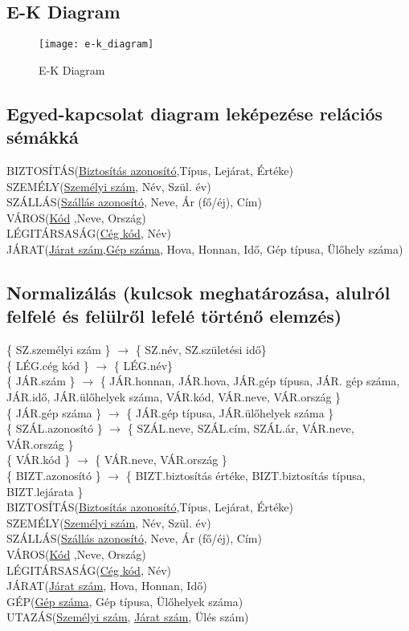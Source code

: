 \subsection{E-K Diagram}

\begin{figure}[!htb]

    \centering
    \texttt{[image: e-k\_diagram]}
    \caption{\label{fig:e-k_diagram}E-K Diagram}

\end{figure}
\pagebreak
\subsection{Egyed-kapcsolat diagram leképezése relációs sémákká}

    BIZTOSÍTÁS(\underline{Biztosítás azonosító},Típus, Lejárat, Értéke)\\
    SZEMÉLY(\underline{Személyi szám}, Név, Szül. év)\\
    SZÁLLÁS(\underline{Szállás azonosító}, Neve, Ár (fő/éj), Cím)\\
    VÁROS(\underline{Kód} ,Neve, Ország)\\
    LÉGITÁRSASÁG(\underline{Cég kód}, Név)\\
    JÁRAT(\underline{Járat szám},\underline{Gép száma}, Hova, Honnan, Idő, Gép típusa, Ülőhely száma)

\subsection{Normalizálás (kulcsok meghatározása, alulról felfelé és felülről lefelé történő elemzés)}

\{ SZ.személyi szám \} $\rightarrow$ \{ SZ.név, SZ.születési idő\} \\
\{ LÉG.cég kód \} $\rightarrow$ \{ LÉG.név\} \\
\{ JÁR.szám \} $\rightarrow$ \{ JÁR.honnan, JÁR.hova, JÁR.gép típusa, JÁR. gép száma, JÁR.idő, JÁR.ülőhelyek száma, VÁR.kód, VÁR.neve, VÁR.ország \} \\
\{ JÁR.gép száma \} $\rightarrow$ \{ JÁR.gép típusa, JÁR.ülőhelyek száma \} \\
\{ SZÁL.azonosító \} $\rightarrow$ \{ SZÁL.neve, SZÁL.cím, SZÁL.ár, VÁR.neve, VÁR.ország \} \\
\{ VÁR.kód \} $\rightarrow$ \{ VÁR.neve, VÁR.ország \} \\
\{ BIZT.azonosító \} $\rightarrow$ \{ BIZT.biztosítás értéke, BIZT.biztosítás típusa, BIZT.lejárata \} \\
BIZTOSÍTÁS(\underline{Biztosítás azonosító},Típus, Lejárat, Értéke)\\
SZEMÉLY(\underline{Személyi szám}, Név, Szül. év)\\
SZÁLLÁS(\underline{Szállás azonosító}, Neve, Ár (fő/éj), Cím)\\
VÁROS(\underline{Kód} ,Neve, Ország)\\
LÉGITÁRSASÁG(\underline{Cég kód}, Név)\\
JÁRAT(\underline{Járat szám}, Hova, Honnan, Idő)\\
GÉP(\underline{Gép száma}, Gép típusa, Ülőhelyek száma)\\
UTAZÁS(\underline{Személyi szám}, \underline{Járat szám}, Ülés szám)
